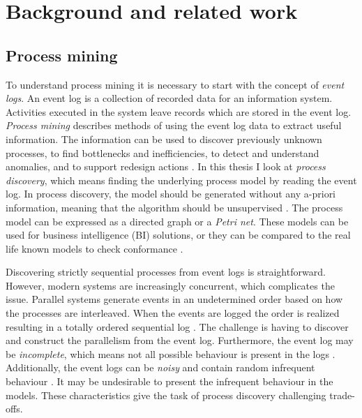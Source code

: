
\clearpage
\section{Background and related work}
\label{sec:background}

\subsection{Process mining}

To understand process mining it is necessary to start with the concept of \emph{event logs}.
An event log is a collection of recorded data for an information system.
Activities executed in the system leave records which are stored in the event log.
\emph{Process mining} describes methods of using the event log data to extract useful information.
The information can be used to discover previously unknown processes, to find bottlenecks and inefficiencies, to detect and understand anomalies, and to support redesign actions \cite{van2015extracting}.
In this thesis I look at \emph{process discovery}, which means finding the underlying process model
by reading the event log.
In process discovery, the model should be generated without any a-priori information, meaning that the algorithm should be unsupervised \cite{van2013discovering}.
The process model can be expressed as a directed graph or a \emph{Petri net}.
These models can be used for business intelligence (BI) solutions, or they can be compared to the real life
known models to check conformance \cite{van2013discovering}.


Discovering strictly sequential processes from event logs is straightforward. However, modern systems are increasingly concurrent, which complicates the issue. 
Parallel systems generate events in an undetermined order based on how the processes are interleaved. 
When the events are logged the order is realized resulting in a totally ordered sequential log \cite{van2004workflow}. 
The challenge is having to discover and construct the parallelism from the event log.
Furthermore, the event log may be \emph{incomplete}, which means not all possible behaviour is present in the logs \cite{van2013discovering}.
Additionally, the event logs can be \emph{noisy} and contain random infrequent behaviour \cite{van2013discovering}.
It may be undesirable to present the infrequent behaviour in the models.
These characteristics give the task of process discovery challenging trade-offs.

